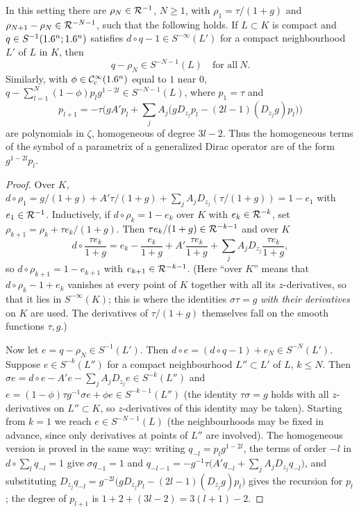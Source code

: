 \begin{lemma}\label{boundary:lem:rational}
In this setting there are $\rho_N\in\mathcal{R}^{-1}$, $N\ge1$, with $\rho_1=\tau/(1+g)$ and
$\rho_{N+1}-\rho_N\in\mathcal{R}^{-N-1}$, such that the following holds. If $L\subset K$ is
compact and $q\in S^{-1}(1.6^n;1.6^n)$ satisfies $d\circ q-1\in S^{-\infty}(L')$ for a
compact neighbourhood $L'$ of $L$ in $K$, then
\begin{equation*}
q-\rho_N\in S^{-N-1}(L)\quad\text{for all}\ N.
\end{equation*}
Similarly, with $\phi\in\mathcal{C}^\infty_{\mathrm{c}}(1.6^n)$ equal to $1$ near $0$,
$q-\sum_{l=1}^N(1-\phi)p_lg^{1-2l}\in S^{-N-1}(L)$, where $p_1=\tau$ and
\begin{equation*}
p_{l+1}=-\tau\Big(gA'p_l+\sum_jA_j\big(gD_{z_j}p_l-(2l-1)(D_{z_j}g)p_l\big)\Big)
\end{equation*}
are polynomials in $\zeta$, homogeneous of degree $3l-2$. Thus the homogeneous terms of
the symbol of a parametrix of a generalized Dirac operator are of the form
$g^{1-2l}p_l$.
\end{lemma}
\begin{proof}
Over $K$, $d\circ\rho_1=g/(1+g)+A'\tau/(1+g)+\sum_jA_jD_{z_j}(\tau/(1+g))=1-e_1$ with
$e_1\in\mathcal{R}^{-1}$. Inductively, if $d\circ\rho_k=1-e_k$ over $K$ with $e_k\in
\mathcal{R}^{-k}$, set $\rho_{k+1}=\rho_k+\tau e_k/(1+g)$. Then $\tau e_k/(1+g)\in\mathcal{R}^{-k-1}$
and over $K$
\begin{equation*}
d\circ\frac{\tau e_k}{1+g}=e_k-\frac{e_k}{1+g}+A'\frac{\tau e_k}{1+g}+\sum_jA_j
D_{z_j}\frac{\tau e_k}{1+g},
\end{equation*}
so $d\circ\rho_{k+1}=1-e_{k+1}$ with $e_{k+1}\in\mathcal{R}^{-k-1}$. (Here ``over $K$''
means that $d\circ\rho_k-1+e_k$ vanishes at every point of $K$ together with all its
$z$-derivatives, so that it lies in $S^{-\infty}(K)$; this is where the identities
$\sigma\tau=g$ \emph{with their derivatives} on $K$ are used. The derivatives of
$\tau/(1+g)$ themselves fall on the smooth functions $\tau,g$.)

Now let $e=q-\rho_N\in S^{-1}(L')$. Then $d\circ e=(d\circ q-1)+e_N\in S^{-N}(L')$.
Suppose $e\in S^{-k}(L'')$ for a compact neighbourhood $L''\subset L'$ of $L$, $k\le
N$. Then $\sigma e=d\circ e-A'e-\sum_jA_jD_{z_j}e\in S^{-k}(L'')$ and
$e=(1-\phi)\tau g^{-1}\sigma e+\phi e\in S^{-k-1}(L'')$ (the identity $\tau\sigma=g$
holds with all $z$-derivatives on $L''\subset K$, so $z$-derivatives of this identity
may be taken). Starting from $k=1$ we
reach $e\in S^{-N-1}(L)$ (the neighbourhoods may be fixed in advance, since only
derivatives at points of $L''$ are involved). The homogeneous version is proved in
the same way: writing $q_{-l}=p_lg^{1-2l}$, the terms of order $-l$ in
$d\circ\sum_lq_{-l}=1$ give $\sigma q_{-1}=1$ and $q_{-l-1}=-g^{-1}\tau\big(A'q_{-l}+
\sum_jA_jD_{z_j}q_{-l}\big)$, and substituting
$D_{z_j}q_{-l}=g^{-2l}\big(gD_{z_j}p_l-(2l-1)(D_{z_j}g)p_l\big)$ gives the recursion for
$p_l$; the degree of $p_{l+1}$ is $1+2+(3l-2)=3(l+1)-2$.
\end{proof}

